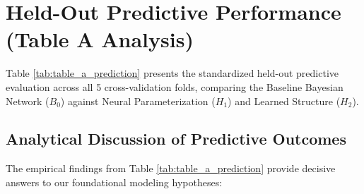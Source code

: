 \section{Held-Out Predictive Performance (Table A Analysis)}
\label{sec:exp_predictive}

Table \ref{tab:table_a_prediction} presents the standardized held-out predictive evaluation across all 5 cross-validation folds, comparing the Baseline Bayesian Network ($B_0$) against Neural Parameterization ($H_1$) and Learned Structure ($H_2$).

\begin{table}[htbp]
    \centering
    \small
    \setlength{\tabcolsep}{5pt}
    \caption{Table A: Held-Out Predictive Performance Across 5-Fold Cross-Validation (Mean $\pm$ Std).}
    \label{tab:table_a_prediction}
\end{table}

\subsection{Analytical Discussion of Predictive Outcomes}

The empirical findings from Table \ref{tab:table_a_prediction} provide decisive answers to our foundational modeling hypotheses:

